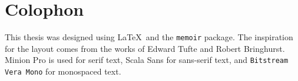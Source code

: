 \pagestyle{empty}
\hfill
\vfill
\section*{Colophon}
This thesis was designed using \LaTeX\ and the \texttt{memoir} package. The inspiration for the layout comes from the works of Edward Tufte and Robert Bringhurst. Minion Pro is used for serif text, {\sffamily Scala Sans} for sans-serif text, and \texttt{Bitstream Vera Mono} for monospaced text.
